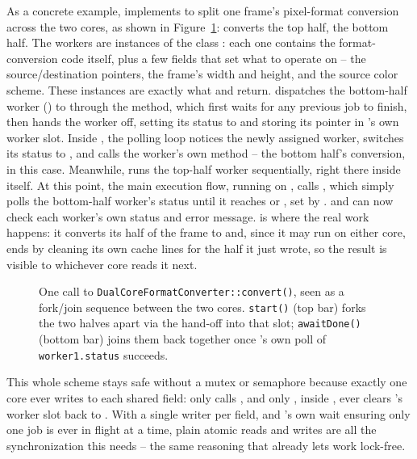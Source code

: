 As a concrete example,  implements  to split one frame's pixel-format conversion across the two cores, as shown in Figure~\ref{fig:fpgasteel-dualcore-forwarding-dispatch-sequence}:  converts the top half,  the bottom half. The workers are instances of the class : each one contains the format-conversion code itself, plus a few fields that set what to operate on -- the source/destination pointers, the frame's width and height, and the source color scheme. These instances are exactly what  and  return.  dispatches the bottom-half worker () to  through the  method, which first waits for any previous job to finish, then hands the worker off, setting its status to  and storing its pointer in 's own worker slot. Inside , the polling loop notices the newly assigned worker, switches its status to , and calls the worker's own  method -- the bottom half's conversion, in this case. Meanwhile,  runs the top-half worker sequentially, right there inside  itself. At this point, the main execution flow, running on , calls , which simply polls the bottom-half worker's status until it reaches  or , set by .  and  can now check each worker's own status and error message.  is where the real work happens: it converts its half of the frame to  and, since it may run on either core, ends by cleaning its own  cache lines for the half it just wrote, so the result is visible to whichever core reads it next.

\begin{figure}[htbp]
 \centering
 
 \caption{One call to \texttt{DualCoreFormatConverter::convert()}, seen as a fork/join sequence between the two cores. \texttt{start()} (top bar) forks the two halves apart via the hand-off into that slot; \texttt{awaitDone()} (bottom bar) joins them back together once 's own poll of \texttt{worker1.status} succeeds.}
 \label{fig:fpgasteel-dualcore-forwarding-dispatch-sequence}
\end{figure}

This whole scheme stays safe without a mutex or semaphore because exactly one core ever writes to each shared field: only  calls , and only , inside , ever clears 's worker slot back to . With a single writer per field, and 's own wait ensuring only one job is ever in flight at a time, plain atomic reads and writes are all the synchronization this needs -- the same reasoning that already lets  work lock-free.

